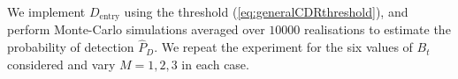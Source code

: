 \documentclass[11pt]{article}
\begin{document}
We implement $D_{\text{entry}}$ using the threshold (\ref{eq:generalCDRthreshold}), and perform Monte-Carlo simulations averaged over $10000$ realisations to estimate the probability of detection $\hat{P}_{D}$. We repeat the experiment for the six values of $B_{t}$ considered and vary $M=1,2,3$ in each case.
\begin{figure}[h!]
\centering
{}

\end{figure}
\end{document}
